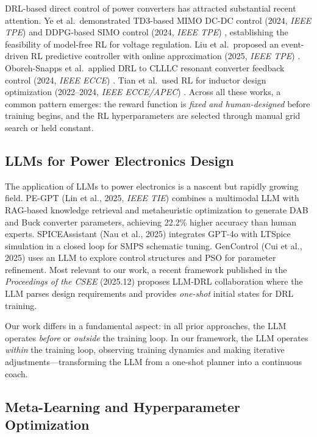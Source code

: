 \documentclass[11pt,a4paper]{article}
\begin{document}
DRL-based direct control of power converters has attracted substantial recent
attention.
Ye et al.\ demonstrated TD3-based MIMO DC-DC control (2024, \textit{IEEE TPE})
\cite{ye2024td3} and DDPG-based SIMO control (2024, \textit{IEEE TPE})
\cite{ye2024ddpg}, establishing the feasibility of model-free RL for
voltage regulation.
Liu et al.\ proposed an event-driven RL predictive controller with online
approximation (2025, \textit{IEEE TPE}) \cite{liu2025event}.
Oboreh-Snapps et al.\ applied DRL to CLLLC resonant converter feedback control
(2024, \textit{IEEE ECCE}) \cite{oboreh2024clllc}.
Tian et al.\ used RL for inductor design optimization (2022--2024,
\textit{IEEE ECCE/APEC}) \cite{tian2022rl,tian2024rl}.
Across all these works, a common pattern emerges: the reward function is
\textit{fixed and human-designed} before training begins, and the RL
hyperparameters are selected through manual grid search or held constant.

\subsection{LLMs for Power Electronics Design}

The application of LLMs to power electronics is a nascent but rapidly growing
field.
PE-GPT (Lin et al., 2025, \textit{IEEE TIE}) \cite{lin2025pegpt} combines
a multimodal LLM with RAG-based knowledge retrieval and metaheuristic
optimization to generate DAB and Buck converter parameters, achieving 22.2\%
higher accuracy than human experts.
SPICEAssistant (Nau et al., 2025) \cite{nau2025spiceassistant} integrates
GPT-4o with LTSpice simulation in a closed loop for SMPS schematic tuning.
GenControl (Cui et al., 2025) \cite{cui2025gencontrol} uses an LLM to explore
control structures and PSO for parameter refinement.
Most relevant to our work, a recent framework published in the
\textit{Proceedings of the CSEE} (2025.12) \cite{drl-llm2025} proposes
LLM-DRL collaboration where the LLM parses design requirements and provides
\textit{one-shot} initial states for DRL training.

Our work differs in a fundamental aspect: in all prior approaches, the LLM
operates \textit{before} or \textit{outside} the training loop.
In our framework, the LLM operates \textit{within} the training loop, observing
training dynamics and making iterative adjustments---transforming the LLM from
a one-shot planner into a continuous coach.

\subsection{Meta-Learning and Hyperparameter Optimization}
\end{document}
